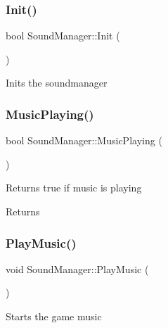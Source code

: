 \mbox{\label{class_sound_manager_af1ee5e29fca894a8ac9aeeb56b81f21d}} 
\subsubsection{\texorpdfstring{Init()}{Init()}}
{\footnotesize\ttfamily bool Sound\+Manager\+::\+Init (\begin{DoxyParamCaption}{ }\end{DoxyParamCaption})}



Inits the soundmanager 

\mbox{\label{class_sound_manager_ae41fb3a3efb5b1fc9b39bd2764a032cc}} 
\subsubsection{\texorpdfstring{Music\+Playing()}{MusicPlaying()}}
{\footnotesize\ttfamily bool Sound\+Manager\+::\+Music\+Playing (\begin{DoxyParamCaption}{ }\end{DoxyParamCaption})}



Returns true if music is playing 

\begin{DoxyReturn}{Returns}

\end{DoxyReturn}
\mbox{\label{class_sound_manager_ab4f6bc3b9c203232424b10da9912cf1b}} 
\subsubsection{\texorpdfstring{Play\+Music()}{PlayMusic()}}
{\footnotesize\ttfamily void Sound\+Manager\+::\+Play\+Music (\begin{DoxyParamCaption}{ }\end{DoxyParamCaption})}



Starts the game music 

